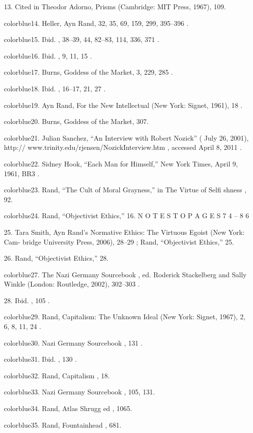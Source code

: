 	{\color{blue}13}. Cited in Theodor Adorno, Prisms (Cambridge: MIT Press, 1967), 109.


	{color{blue}14}. Heller, Ayn Rand, 32, 35, 69, 159, 299, 395–396 .


	{color{blue}15}. Ibid. , 38–39, 44, 82–83, 114, 336, 371 .


	{color{blue}16}. Ibid. , 9, 11, 15 .


	{color{blue}17}. Burns, Goddess of the Market, 3, 229, 285 .


	{color{blue}18}. Ibid. , 16–17, 21, 27 .


	{color{blue}19}. Ayn Rand, For the New Intellectual (New York: Signet, 1961), 18 .


	{color{blue}20}. Burns, Goddess of the Market, 307.


	{color{blue}21}. Julian Sanchez, “An Interview with Robert Nozick” ( July 26, 2001), http:// www.trinity.edu/rjensen/NozickInterview.htm , accessed April 8, 2011 .


	{color{blue}22}. Sidney Hook, “Each Man for Himself,” New York Times, April 9, 1961, BR3 .


	{color{blue}23}. Rand, “The Cult of Moral Grayness,” in The Virtue of Selfi shness , 92.


	{color{blue}24}. Rand, “Objectivist Ethics,” 16. N O T E S T O P A G E S 7 4 – 8 6


	{\color{blue}25}. Tara Smith, Ayn Rand’s Normative Ethics: The Virtuous Egoist (New York: Cam- bridge University Press, 2006), 28–29 ; Rand, “Objectivist Ethics,” 25.


	{\color{blue}26}. Rand, “Objectivist Ethics,” 28.


	{color{blue}27}. The Nazi Germany Sourcebook , ed. Roderick Stackelberg and Sally Winkle (London: Routledge, 2002), 302–303 .


	{\color{blue}28}. Ibid. , 105 .


	{color{blue}29}. Rand, Capitalism: The Unknown Ideal (New York: Signet, 1967), 2, 6, 8, 11, 24 .


	{color{blue}30}. Nazi Germany Sourcebook , 131 .


	{color{blue}31}. Ibid. , 130 .


	{color{blue}32}. Rand, Capitalism , 18.


	{color{blue}33}. Nazi Germany Sourcebook , 105, 131.


	{color{blue}34}. Rand, Atlas Shrugg ed , 1065.


	{color{blue}35}. Rand, Fountainhead , 681.


